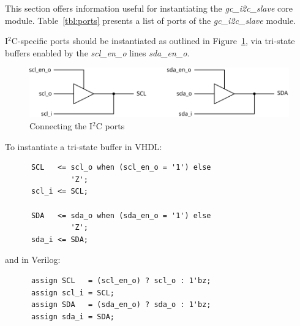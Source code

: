 \documentclass[a4paper,11pt]{article}
\begin{document}
This section offers information useful for instantiating the \textit{gc\_i2c\_slave} core module. 
Table~\ref{tbl:ports} presents a list of ports of the \textit{gc\_i2c\_slave} module. 

I$^2$C-specific ports should be instantiated as outlined in Figure~\ref{fig:i2c-ports}, via 
tri-state buffers enabled by the \textit{scl\_en\_o} lines \textit{sda\_en\_o}.

\begin{figure}[h]
  \centerline{\includegraphics[width=.75\textwidth]{fig/i2c-ports}}
  \caption{Connecting the I$^2$C ports}
  \label{fig:i2c-ports}
\end{figure}

To instantiate a tri-state buffer in VHDL:

\footnotesize
\begin{verbatim}
      SCL   <= scl_o when (scl_en_o = '1') else
               'Z';
      scl_i <= SCL;

      SDA   <= sda_o when (sda_en_o = '1') else
               'Z';
      sda_i <= SDA;
\end{verbatim}

\normalsize
\noindent and in Verilog:

\footnotesize
\begin{verbatim}
      assign SCL   = (scl_en_o) ? scl_o : 1'bz;
      assign scl_i = SCL;
      assign SDA   = (sda_en_o) ? sda_o : 1'bz;
      assign sda_i = SDA;
\end{verbatim}

\normalsize
\end{document}
